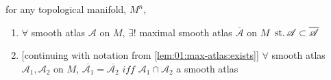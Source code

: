 \begin{lem}\label{lem:1.10}\label{lem:01:max-atlas}
  for any topological manifold, $M^n$,
  \begin{enumerate}[label=(\alph*)]
  \item\label{lem:01:max-atlas:exists}
    $\forall$ smooth atlas $\mathscr A$ on $M$,
    $\exists!$ maximal smooth atlas $\overline{\mathscr A}$
    on $M$ $\operatorname{\,st.} \mathscr A\subset\overline{\mathscr A}$
  \item\label{lem:01:max-atlas:pair-uniq}
    [continuing with notation from \ref{lem:01:max-atlas:exists}]
    $\forall$ smooth atlas $\mathscr A_1,\mathscr A_2$ on $M$,
    $\overline{\mathscr A_1} = \overline{\mathscr A_2}$
    $iff$ $\mathscr A_1 \cap \mathscr A_2$ a smooth atlas
  \end{enumerate}
\end{lem}
